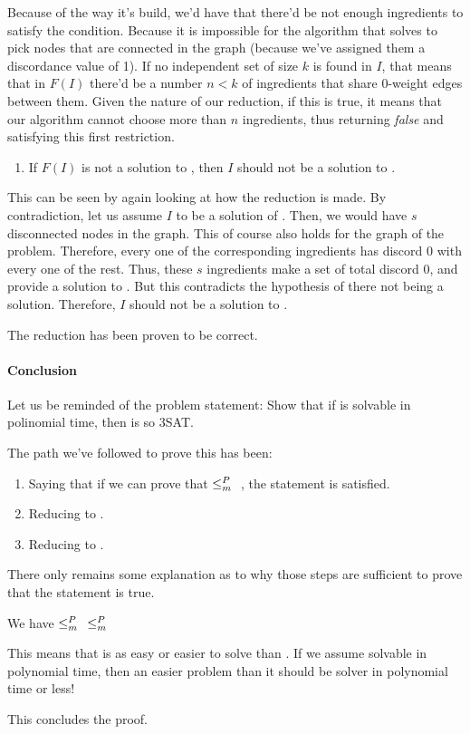 Because of the way it's build, we'd have that there'd be not enough ingredients to satisfy the condition. Because it is impossible for the algorithm that solves \exc{} to pick nodes that are connected in the graph (because we've assigned them a discordance value of 1). If no independent set of size $k$ is found in $I$, that means that  in $F(I)$ there'd be a number $n < k$ of ingredients that share 0-weight edges between them. Given the nature of our reduction, if this is true, it means that our algorithm cannot choose more than $n$ ingredients, thus returning \textit{false} and satisfying this first restriction.

\begin{enumerate}[resume]
  \item If $F(I)$ is not a solution to \exc{}, then $I$ should not be a solution to \is{}.
\end{enumerate}

This can be seen by again looking at how the reduction is made. By contradiction, let us assume $I$ to be a solution of \is{}. Then, we would have $s$ disconnected nodes in the graph. This of course also holds for the graph of the \exc{} problem. Therefore, every one of the corresponding ingredients has discord 0 with every one of the rest. Thus, these $s$ ingredients make a set of total discord 0, and provide a solution to \exc{}. But this contradicts the hypothesis of there not being a solution. Therefore, $I$ should not be a solution to \is{}.

The reduction has been proven to be correct.

\paragraph{Conclusion}

Let us be reminded of the problem statement: Show that if \exc{} is solvable in polinomial time, then is so 3SAT.

The path we've followed to prove this has been:

\begin{enumerate}
  \item Saying that if we can prove that \tsat{} $\leq_m^P{}$ \exc{}, the statement is satisfied.
  \item Reducing \tsat{} to \is{}.
  \item Reducing \is{} to \exc{}.
\end{enumerate}

There only remains some explanation as to why those steps are sufficient to prove that the statement is true.

We have \tsat{} $\leq_m^P{}$ \is{} $\leq_m^P{}$ \exc{}

This means that \tsat{} is as easy or easier to solve than \exc{}. If we assume \exc{} solvable in polynomial time, then an easier problem than it should be solver in polynomial time or less!

This concludes the proof.
